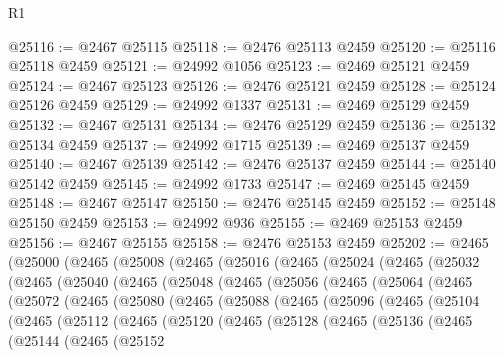 \begin{lexlean}{R1}
\begin{coremodule}
@25116 := @2467 @25115
@25118 := @2476 @25113 @2459
@25120 := @25116 @25118 @2459
@25121 := @24992 @1056
@25123 := @2469 @25121 @2459
@25124 := @2467 @25123
@25126 := @2476 @25121 @2459
@25128 := @25124 @25126 @2459
@25129 := @24992 @1337
@25131 := @2469 @25129 @2459
@25132 := @2467 @25131
@25134 := @2476 @25129 @2459
@25136 := @25132 @25134 @2459
@25137 := @24992 @1715
@25139 := @2469 @25137 @2459
@25140 := @2467 @25139
@25142 := @2476 @25137 @2459
@25144 := @25140 @25142 @2459
@25145 := @24992 @1733
@25147 := @2469 @25145 @2459
@25148 := @2467 @25147
@25150 := @2476 @25145 @2459
@25152 := @25148 @25150 @2459
@25153 := @24992 @936
@25155 := @2469 @25153 @2459
@25156 := @2467 @25155
@25158 := @2476 @25153 @2459
@25202 := @2465
    (@25000
      (@2465
        (@25008
          (@2465
            (@25016
              (@2465
                (@25024
                  (@2465
                    (@25032
                      (@2465
                        (@25040
                          (@2465
                            (@25048
                              (@2465
                                (@25056
                                  (@2465
                                    (@25064
                                      (@2465
                                        (@25072
                                          (@2465
                                            (@25080
                                              (@2465
                                                (@25088
                                                  (@2465
                                                    (@25096
                                                      (@2465
                                                        (@25104
                                                          (@2465
                                                            (@25112
                                                              (@2465
                                                                (@25120
                                                                  (@2465
                                                                    (@25128
                                                                      (@2465
                                                                        (@25136
                                                                          (@2465
                                                                            (@25144
                                                                              (@2465
                                                                                (@25152

\end{coremodule}
\end{lexlean}
